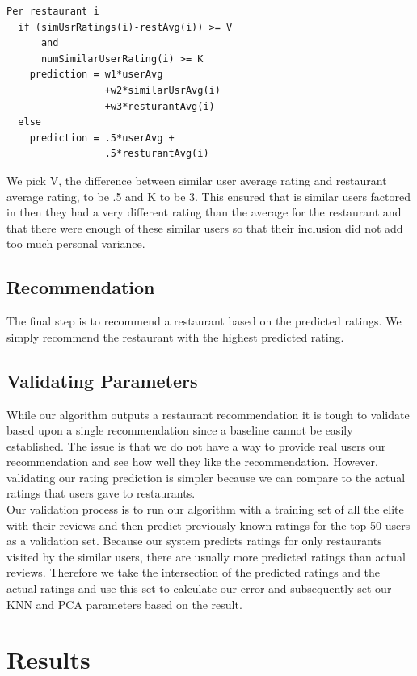\documentclass[10pt,twocolumn,letterpaper]{article}
\begin{document}
\begin{verbatim}
Per restaurant i
  if (simUsrRatings(i)-restAvg(i)) >= V 
      and
      numSimilarUserRating(i) >= K
    prediction = w1*userAvg
                 +w2*similarUsrAvg(i)
                 +w3*resturantAvg(i)
  else
    prediction = .5*userAvg +
                 .5*resturantAvg(i)
\end{verbatim}

We pick V, the difference between similar user average rating and restaurant average rating, to be .5 and K to be 3. This ensured that is similar users factored in then they had a very different rating than the average for the restaurant and that there were enough of these similar users so that their inclusion did not add too much personal variance.

\subsection{Recommendation}
The final step is to recommend a restaurant based on the predicted ratings. We simply recommend the restaurant with the highest predicted rating.

\subsection{Validating Parameters}
While our algorithm outputs a restaurant recommendation it is tough to validate based upon a single recommendation since a baseline cannot be easily established. The issue is that we do not have a way to provide real users our recommendation and see how well they like the recommendation. However, validating our rating prediction is simpler because we can compare to the actual ratings that users gave to restaurants.
\\[0.5em]
\indent Our validation process is to run our algorithm with a training set of all the elite with their reviews and then predict previously known ratings for the top 50 users as a validation set. Because our system predicts ratings for only restaurants visited by the similar users, there are usually more predicted ratings than actual reviews. Therefore we take the intersection of the predicted ratings and the actual ratings and use this set to calculate our error and subsequently set our KNN and PCA parameters based on the result.


\section{Results}
\end{document}
